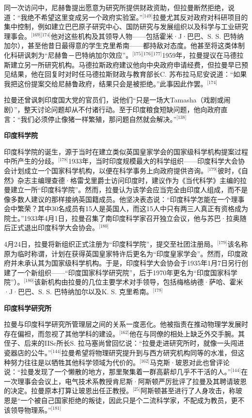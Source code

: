同一次访问中，尼赫鲁提出愿意为研究所提供财政资助，但拉曼断然拒绝，说道：“我绝不希望这里变成另一个政府实验室。”\(^\text{[149]}\)拉曼尤其反对政府对科研项目的集中控制，例如建立巴巴原子研究中心、国防研究与发展组织以及科学与工业研究理事会。\(^\text{[169][174]}\)他对这些机构及其领导人物——包括霍米·J·巴巴、S. S. 巴特纳加尔），甚至他昔日最得意的学生克里希南——都持敌对态度。他甚至将这类体制化科研讽刺为“尼赫鲁－巴特纳加尔效应”。\(^\text{[175][176][177]}\)1959年，拉曼提议在马德拉斯建立另一所研究机构。马德拉斯政府建议他向中央政府申请经费，但拉曼早已预见结果，他在回复时对时任马德拉斯财政与教育部长C. 苏布拉马尼安说道：“如果我把这份提案交给尼赫鲁政府，结果只会是被拒绝。”此事因此作罢。\(^\text{[174]}\)

拉曼还曾讽刺印度国大党的官员们，说他们“只是一场大Tamasha（戏剧或闹剧）”，整天讨论问题却从不付诸行动。至于印度粮食短缺问题，他向政府直言：“我们必须停止像猪一样繁殖，那问题自然就会解决。”\(^\text{[138]}\)

\textbf{印度科学院}

印度科学院的诞生，源于当时在建立类似英国皇家学会的国家级科学机构提案过程中所产生的分歧。\(^\text{[178]}\)1933年，当时印度规模最大的科学组织——印度科学大会协会计划成立一个国家科学机构，以便在科学事务上向政府提供咨询。\(^\text{[179]}\)彼时，《自然》杂志主编理查德·格雷戈里爵士访问印度时，建议作为《当代科学》主编的拉曼建立一所“印度科学院”。然而，拉曼认为该学会应当完全由印度人组成，而不是像多数人建议的那样接纳英国籍成员。他坚决表态说：“印度科学怎能在一个理事会中繁荣？其中30名成员有15人是英国人，而这15人中只有两三人真正有资格成为院士。”1933年4月1日，拉曼召集了南印度科学家召开独立会议，他与苏巴·拉奥随后正式退出印度科学大会协会。\(^\text{[180]}\)

4月24日，拉曼将新组织正式注册为“印度科学院”，提交至社团注册局。\(^\text{[179]}\)该名称原为临时称谓，计划在获得英国皇家特许后更名为“印度皇家学会”。然而，印度政府并未承认其为国家级科学机构。于是，印度科学大会协会于1935年1月7日另行创建了一个新组织——“印度国家科学研究院”，后于1970年更名为“印度国家科学院”）。\(^\text{[180]}\)该新机构由拉曼的几位主要学术对手领导，包括梅格纳德·萨哈、霍米·J·巴巴、S. S. 巴特纳加尔以及K. S. 克里希南。\(^\text{[178]}\)

\textbf{印度科学研究所}

拉曼与印度科学研究所管理层之间的关系一度恶化。他被指责在推动物理学发展时存在偏袒，而忽视了其他学科的建设。\(^\text{[162]}\)他在与同僚的相处上缺乏外交手腕。其侄子、后来的IISc所长S. 拉马塞尚曾回忆说：“拉曼走进研究所时，就像一头闯进瓷器店的公牛。”\(^\text{[144]}\)拉曼希望将物理研究提升到与西方研究机构同等的水准，但这种努力往往是以牺牲其他科学领域为代价的。\(^\text{[162]}\)马克斯·玻恩对此也曾评论说：“拉曼发现了一个懒散的地方，那里聚集着一群高薪却几乎不干活的人。”\(^\text{[144]}\)在一次理事会会议上，电气技术系教授肯尼斯·阿斯顿严厉批评了拉曼及其聘请玻恩的决定。拉曼原本打算让玻恩出任正教授。\(^\text{[25]}\)阿斯顿甚至进行了人身攻击，称玻恩是“一个被自己国家拒绝的叛徒，因此只是个二流科学家，不配成为教员，更不该领导物理系。”\(^\text{[181]}\)

